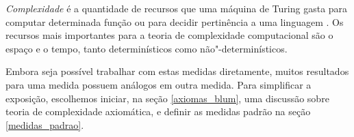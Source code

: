 \emph{Complexidade} é a quantidade de recursos
que uma máquina de Turing gasta
para computar determinada função
ou para decidir pertinência a uma linguagem
\cite[p.~285]{HopcroftUllman1979}.
Os recursos mais importantes para a teoria de complexidade computacional
são o espaço e o tempo,
tanto determinísticos como não"-determinísticos.

Embora seja possível trabalhar com estas medidas diretamente,
muitos resultados para uma medida
possuem análogos em outra medida.
Para simplificar a exposição,
escolhemos iniciar,
na seção \ref{axiomas_blum},
uma discussão sobre teoria de complexidade axiomática,
e definir as medidas padrão na seção \ref{medidas_padrao}.
